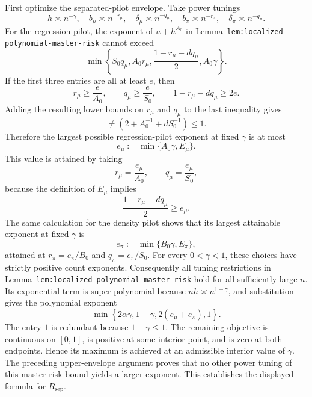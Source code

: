 First optimize the separated-pilot envelope. Take power tunings
\[
h\asymp n^{-\gamma},
\quad b_\mu\asymp n^{-r_\mu},
\quad \delta_\mu\asymp n^{-q_\mu},
\quad b_\pi\asymp n^{-r_\pi},
\quad \delta_\pi\asymp n^{-q_\pi}.
\]
For the regression pilot, the exponent of \(u+h^{A_0}\) in Lemma~\texttt{lem:localized-polynomial-master-risk} cannot exceed
\[
\min\left\{S_0q_\mu,A_0r_\mu,
\frac{1-r_\mu-dq_\mu}{2},A_0\gamma\right\}.
\]
If the first three entries are all at least \(e\), then
\[
r_\mu\ge \frac{e}{A_0},
\qquad q_\mu\ge \frac{e}{S_0},
\qquad 1-r_\mu-dq_\mu\ge 2e.
\]
Adding the resulting lower bounds on \(r_\mu\) and \(q_\mu\) to the last inequality gives
\[\ne\left(2+A_0^{-1}+dS_0^{-1}\right)\le 1.
\]
Therefore the largest possible regression-pilot exponent at fixed \(\gamma\) is at most
\[
e_\mu:=\min\{A_0\gamma,E_\mu\}.
\]
This value is attained by taking
\[
r_\mu=\frac{e_\mu}{A_0},
\qquad q_\mu=\frac{e_\mu}{S_0},
\]
because the definition of \(E_\mu\) implies
\[
\frac{1-r_\mu-dq_\mu}{2}\ge e_\mu.
\]
The same calculation for the density pilot shows that its largest attainable exponent at fixed \(\gamma\) is
\[
e_\pi:=\min\{B_0\gamma,E_\pi\},
\]
attained at \(r_\pi=e_\pi/B_0\) and \(q_\pi=e_\pi/S_0\). For every \(0<\gamma<1\), these choices have strictly positive count exponents. Consequently all tuning restrictions in Lemma~\texttt{lem:localized-polynomial-master-risk} hold for all sufficiently large \(n\). Its exponential term is super-polynomial because \(nh\asymp n^{1-\gamma}\), and substitution gives the polynomial exponent
\[
\min\left\{2\alpha\gamma,1-\gamma,2(e_\mu+e_\pi),1\right\}.
\]
The entry \(1\) is redundant because \(1-\gamma\le1\). The remaining objective is continuous on \([0,1]\), is positive at some interior point, and is zero at both endpoints. Hence its maximum is achieved at an admissible interior value of \(\gamma\). The preceding upper-envelope argument proves that no other power tuning of this master-risk bound yields a larger exponent. This establishes the displayed formula for \(R_{\mathrm{sep}}\).

